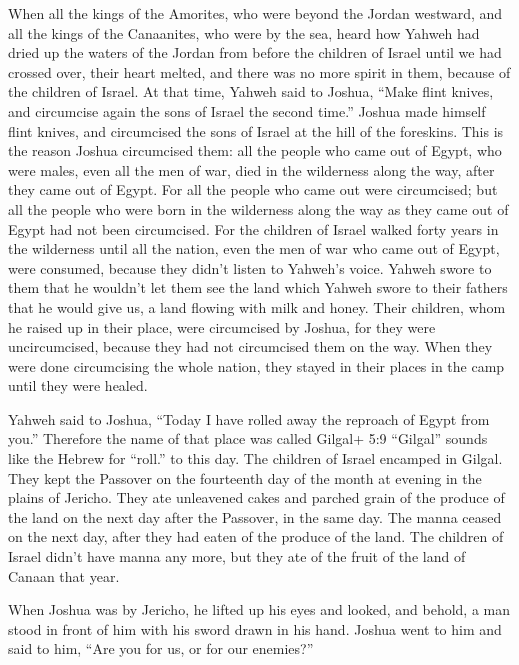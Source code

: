  When all the kings of the Amorites, who were beyond the
Jordan westward, and all the kings of the Canaanites, who were by the
sea, heard how Yahweh had dried up the waters of the Jordan from before
the children of Israel until we had crossed over, their heart melted,
and there was no more spirit in them, because of the children of Israel.
 At that time, Yahweh said to Joshua, ``Make flint knives,
and circumcise again the sons of Israel the second time.'' 
Joshua made himself flint knives, and circumcised the sons of Israel at
the hill of the foreskins.  This is the reason Joshua
circumcised them: all the people who came out of Egypt, who were males,
even all the men of war, died in the wilderness along the way, after
they came out of Egypt.  For all the people who came out
were circumcised; but all the people who were born in the wilderness
along the way as they came out of Egypt had not been circumcised.
 For the children of Israel walked forty years in the
wilderness until all the nation, even the men of war who came out of
Egypt, were consumed, because they didn't listen to Yahweh's voice.
Yahweh swore to them that he wouldn't let them see the land which Yahweh
swore to their fathers that he would give us, a land flowing with milk
and honey.  Their children, whom he raised up in their
place, were circumcised by Joshua, for they were uncircumcised, because
they had not circumcised them on the way.  When they were
done circumcising the whole nation, they stayed in their places in the
camp until they were healed.

 Yahweh said to Joshua, ``Today I have rolled away the
reproach of Egypt from you.'' Therefore the name of that place was
called Gilgal+ 5:9 ``Gilgal'' sounds like the Hebrew for ``roll.'' to
this day.  The children of Israel encamped in Gilgal. They
kept the Passover on the fourteenth day of the month at evening in the
plains of Jericho.  They ate unleavened cakes and parched
grain of the produce of the land on the next day after the Passover, in
the same day.  The manna ceased on the next day, after they
had eaten of the produce of the land. The children of Israel didn't have
manna any more, but they ate of the fruit of the land of Canaan that
year.

 When Joshua was by Jericho, he lifted up his eyes and
looked, and behold, a man stood in front of him with his sword drawn in
his hand. Joshua went to him and said to him, ``Are you for us, or for
our enemies?''

